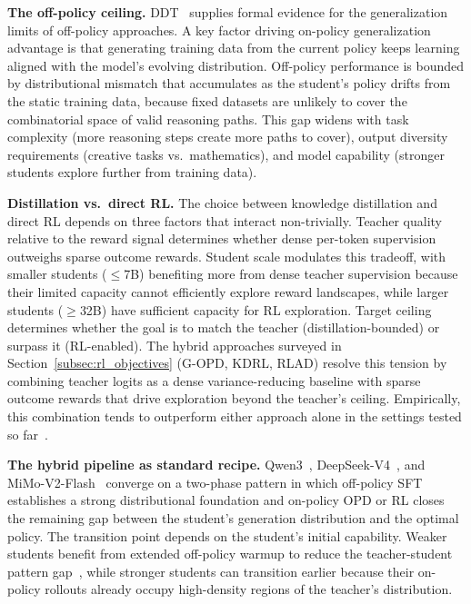 \documentclass{article} %
\begin{document}
\textbf{The off-policy ceiling.} DDT~\citep{2602.12222} supplies formal evidence for the generalization limits of off-policy approaches. A key factor driving on-policy generalization advantage is that generating training data from the current policy keeps learning aligned with the model's evolving distribution. Off-policy performance is bounded by distributional mismatch that accumulates as the student's policy drifts from the static training data, because fixed datasets are unlikely to cover the combinatorial space of valid reasoning paths. This gap widens with task complexity (more reasoning steps create more paths to cover), output diversity requirements (creative tasks vs.\ mathematics), and model capability (stronger students explore further from training data).

\textbf{Distillation vs.\ direct RL.} The choice between knowledge distillation and direct RL depends on three factors that interact non-trivially. Teacher quality relative to the reward signal determines whether dense per-token supervision outweighs sparse outcome rewards. Student scale modulates this tradeoff, with smaller students ($\le$7B) benefiting more from dense teacher supervision because their limited capacity cannot efficiently explore reward landscapes, while larger students ($\ge$32B) have sufficient capacity for RL exploration. Target ceiling determines whether the goal is to match the teacher (distillation-bounded) or surpass it (RL-enabled). The hybrid approaches surveyed in Section~\ref{subsec:rl_objectives} (G-OPD, KDRL, RLAD) resolve this tension by combining teacher logits as a dense variance-reducing baseline with sparse outcome rewards that drive exploration beyond the teacher's ceiling. Empirically, this combination tends to outperform either approach alone in the settings tested so far~\citep{2602.12125,2506.02208,2602.22495}.

\textbf{The hybrid pipeline as standard recipe.} Qwen3~\citep{2505.09388}, DeepSeek-V4~\citep{deepseekv4}, and MiMo-V2-Flash~\citep{2601.02780} converge on a two-phase pattern in which off-policy SFT establishes a strong distributional foundation and on-policy OPD or RL closes the remaining gap between the student's generation distribution and the optimal policy. The transition point depends on the student's initial capability. Weaker students benefit from extended off-policy warmup to reduce the teacher-student pattern gap~\citep{2604.13016}, while stronger students can transition earlier because their on-policy rollouts already occupy high-density regions of the teacher's distribution.
\end{document}
